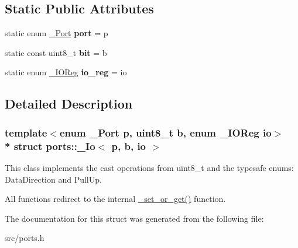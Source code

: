 \subsection*{Static Public Attributes}
\begin{DoxyCompactItemize}
\item 
static enum \hyperlink{namespaceports_a9949317f344930bd6ad1097e80c97b67}{\+\_\+\+Port} {\bfseries port} = p\hypertarget{structports_1_1__Io_adad70155dd6893a33058c00b39a61868}{}\label{structports_1_1__Io_adad70155dd6893a33058c00b39a61868}

\item 
static const uint8\+\_\+t {\bfseries bit} = b\hypertarget{structports_1_1__Io_ab6ad4e5dabbb7a274ef5299a9bdb094f}{}\label{structports_1_1__Io_ab6ad4e5dabbb7a274ef5299a9bdb094f}

\item 
static enum \hyperlink{namespaceports_a739630fb6b9a9b963453db8e865b6b14}{\+\_\+\+I\+O\+Reg} {\bfseries io\+\_\+reg} = io\hypertarget{structports_1_1__Io_aef8bb0a06b5abeef91f6916b828739df}{}\label{structports_1_1__Io_aef8bb0a06b5abeef91f6916b828739df}

\end{DoxyCompactItemize}


\subsection{Detailed Description}
\subsubsection*{template$<$enum \+\_\+\+Port p, uint8\+\_\+t b, enum \+\_\+\+I\+O\+Reg io$>$\\*
struct ports\+::\+\_\+\+Io$<$ p, b, io $>$}

This class implements the cast operations from uint8\+\_\+t and the typesafe enums\+: Data\+Direction and Pull\+Up. 

All functions redirect to the internal \hyperlink{namespaceports_aa339a9d178cb414c4cf243450d5887d2}{\+\_\+set\+\_\+or\+\_\+get()} function. 

The documentation for this struct was generated from the following file\+:\begin{DoxyCompactItemize}
\item 
src/ports.\+h\end{DoxyCompactItemize}
